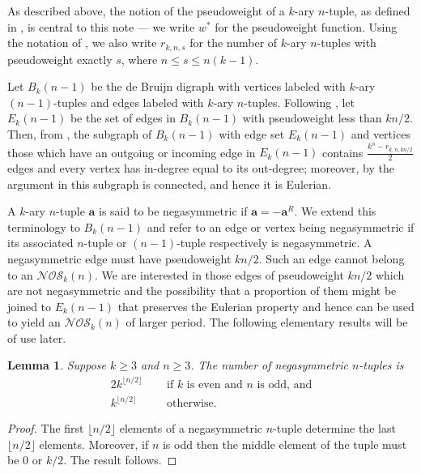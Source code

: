 \documentclass[a4paper,11pt]{article}
\theoremstyle{plain}
\newtheorem{lemma}{Lemma}[section]
\theoremstyle{definition}
\theoremstyle{remark}
\begin{document}
As described above, the notion of the pseudoweight of a $k$-ary $n$-tuple, as defined
in \cite{Mitchell25a}, is central to this note --- we write $w^*$ for the pseudoweight function.
Using the notation of \cite{Mitchell25a}, we also write $r_{k,n,s}$ for the number of $k$-ary
$n$-tuples with pseudoweight exactly $s$, where $n\leq s\leq n(k-1)$.

Let $B_k(n-1)$ be the de Bruijn digraph with vertices labeled with $k$-ary $(n-1)$-tuples and edges
labeled with $k$-ary $n$-tuples. Following \cite{Mitchell26}, let $E_k(n-1)$ be the set of edges in
$B_k(n-1)$ with pseudoweight less than $kn/2$.  Then, from \cite[Theorem 5.3]{Mitchell26}, the
subgraph of $B_k(n-1)$ with edge set $E_k(n-1)$ and vertices those which have an outgoing or
incoming edge in $E_k(n-1)$ contains $\frac{k^n-r_{k,n,kn/2}}{2}$ edges and every vertex has
in-degree equal to its out-degree; moreover, by the argument in \cite[Section 3.3]{Mitchell25a}
this subgraph is connected, and hence it is Eulerian.

A $k$-ary $n$-tuple $\mathbf{a}$ is said to be negasymmetric if $\mathbf{a}=-\mathbf{a}^R$. We
extend this terminology to $B_k(n-1)$ and refer to an edge or vertex being negasymmetric if its
associated $n$-tuple or $(n-1)$-tuple respectively is negasymmetric. A negasymmetric edge must have
pseudoweight $kn/2$. Such an edge cannot belong to an $\mathcal{NOS}_k(n)$. We are interested in
those edges of pseudoweight $kn/2$ which are not negasymmetric and the possibility that a
proportion of them might be joined to $E_k(n-1)$ that preserves the Eulerian property and hence can
be used to yield an $\mathcal{NOS}_k(n)$ of larger period.  The following elementary results will
be of use later.

\begin{lemma}  \label{lemma:number_of_nega_tuples}
Suppose $k\geq 3$ and $n\geq3$.  The number of negasymmetric $n$-tuples is
\[
\begin{split}
2k^{\lfloor n/2\rfloor} & \text{~~~~if $k$ is even and $n$ is odd, and} \\
k^{\lfloor n/2\rfloor} & \text{~~~~otherwise.}
\end{split}
\]
\end{lemma}

\begin{proof}
The first $\lfloor n/2\rfloor$ elements of a negasymmetric $n$-tuple determine the last $\lfloor
n/2\rfloor$ elements.  Moreover, if $n$ is odd then the middle element of the tuple must be $0$ or
$k/2$. The result follows.
\end{proof}
\end{document}
